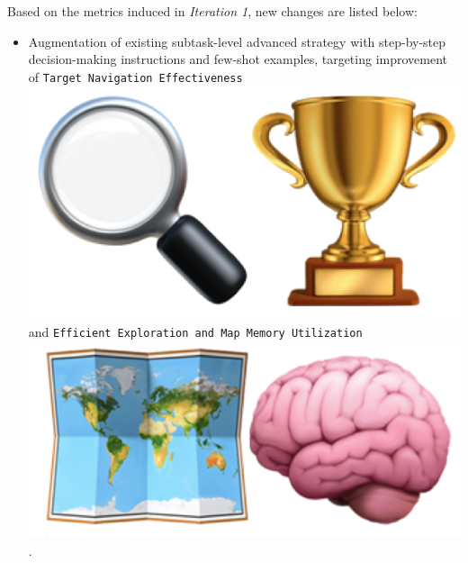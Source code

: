 \begin{flushleft}
	Based on the metrics induced in \emph{Iteration 1}, new changes are listed below:
	\begin{itemize}
		\item Augmentation of existing subtask-level advanced strategy with step-by-step
			decision-making instructions and few-shot examples, targeting improvement
			of \texttt{Target Navigation Effectiveness}
			\includegraphics[scale=0.05]{figs/emojis/mini_1.png}
			and \texttt{Efficient Exploration and Map Memory Utilization}
			\includegraphics[scale=0.05]{figs/emojis/mini_2.png}
			.


\end{itemize}
\end{flushleft}
